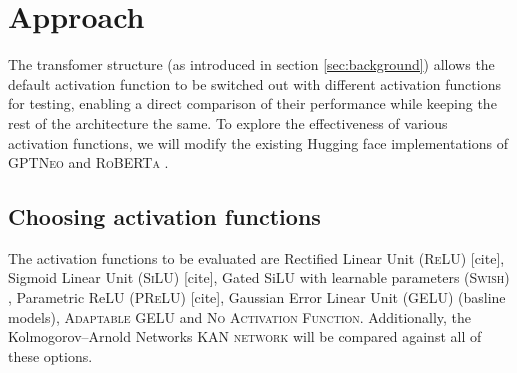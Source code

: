 



\section{Approach} %
\label{sec:approach}
The transfomer structure (as introduced in section \ref{sec:background}) allows the default activation function to be switched out with different activation functions for testing, enabling a direct comparison of their performance while keeping the rest of the architecture the same. To explore the effectiveness of various activation functions, we will modify the existing Hugging face implementations of \textsc{GPTNeo} \cite{huggingfaceNEO} and \textsc{RoBERTa} \cite{huggingfaceRoberta}.

\subsection{Choosing activation functions}
The activation functions to be evaluated are Rectified Linear Unit (\textsc{ReLU}) [cite], Sigmoid Linear Unit (\textsc{SiLU}) [cite], Gated SiLU with learnable parameters (\textsc{Swish}) \cite{eger_is_2019}, Parametric ReLU (\textsc{PReLU}) [cite], Gaussian Error Linear Unit (\textsc{GELU}) (basline models), \textsc{Adaptable GELU} and \textsc{No Activation Function}. Additionally, the Kolmogorov–Arnold Networks \textsc{KAN network} \cite{Liu2024} will be compared against all of these options.

